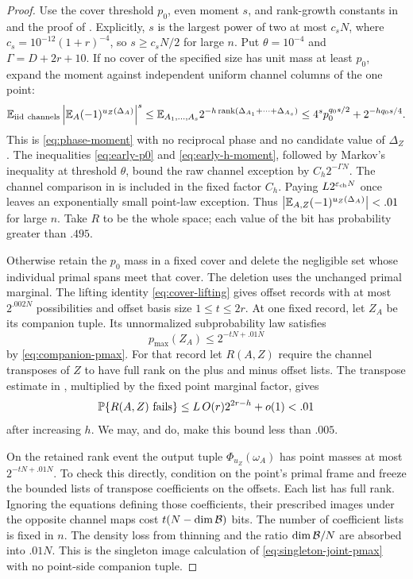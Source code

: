 \begin{proof}
Use the cover threshold \(p_0\), even moment \(s\), and
rank-growth constants in  and the proof
of .  Explicitly, \(s\) is the
largest power of two at most \(c_sN\), where
\(c_s=10^{-12}(1+r)^{-4}\), so \(s\ge c_sN/2\) for large
\(n\).  Put \(\theta=10^{-4}\) and
\(\Gamma=D+2r+10\).  If no cover of the specified
size has unit mass at least \(p_0\), expand the moment against
independent uniform channel columns of the one point:
\[
 \mathbb E_{\rm iid\ channels}
     \left|\mathbb E_A(-1)^{u_Z(\Delta_A)}\right|^s
 \le \mathbb E_{A_1,\ldots,A_s}
       2^{-h\operatorname{rank}(\Delta_{A_1}+\cdots+\Delta_{A_s})}
 \le 4^s p_0^{q_0s/2}+2^{-hq_0s/4}.
\]
This is \eqref{eq:phase-moment} with no reciprocal phase and no
candidate value of \(\Delta_Z\).  The inequalities
\eqref{eq:early-p0} and \eqref{eq:early-h-moment}, followed
by Markov's inequality at threshold \(\theta\), bound the
raw channel exception by \(C_h2^{-\Gamma N}\).  The channel
comparison in  is included in the fixed
factor \(C_h\).  Paying \(L2^{\varepsilon_{\rm ch}N}\)
once leaves an exponentially small point-law exception.  Thus
\(\left|\mathbb E_{A,Z}(-1)^{u_Z(\Delta_A)}\right|<.01\)
for large \(n\).  Take \(R\) to be the whole space; each
value of the bit has probability greater than \(.495\).

Otherwise retain the \(p_0\) mass in a fixed cover and delete
the negligible set whose individual primal spans meet that
cover.  The deletion uses the unchanged primal marginal.  The
lifting identity \eqref{eq:cover-lifting} gives offset records
with at most \(2^{.002N}\) possibilities and offset basis size
\(1\le t\le2r\).  At one fixed record, let \(Z_A\) be its
companion tuple.  Its unnormalized subprobability law satisfies
\[
 p_{\max}(Z_A)\le2^{-tN+.01N}
\]
by \eqref{eq:companion-pmax}.  For that record let \(R(A,Z)\)
require the channel transposes of \(Z\) to have full rank on
the plus and minus offset lists.  The transpose estimate in
, multiplied by the fixed point
marginal factor, gives
\[
 \mathbb P\{R(A,Z)\text{ fails}\}
 \le L\,O(r)2^{2r-h}+o(1)<.01
\]
after increasing \(h\).  We may, and do, make this bound less
than \(.005\).

On the retained rank event the output tuple
\(\Phi_{u_Z}(\omega_A)\) has point masses at most
\(2^{-tN+.01N}\).  To check this directly, condition on the
point's primal frame and freeze the bounded lists of transpose
coefficients on the offsets.  Each list has full rank.  Ignoring
the equations defining those coefficients, their prescribed
images under the opposite channel maps cost
\(t(N-\dim\mathcal B)\) bits.  The number of coefficient lists is
fixed in \(n\).  The density loss from thinning and the ratio
\(\dim\mathcal B/N\) are absorbed into \(.01N\).  This is the
singleton image calculation of \eqref{eq:singleton-joint-pmax}
with no point-side companion tuple.


\end{proof}
